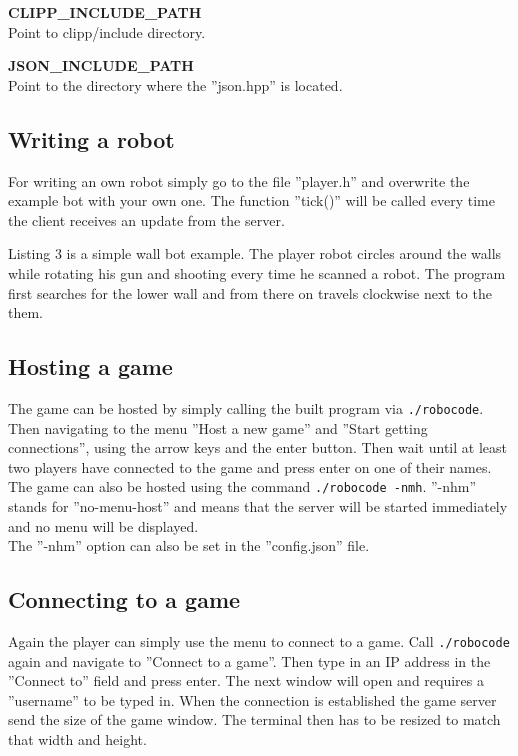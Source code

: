 \documentclass[12pt]{report}
\begin{document}
\textbf{CLIPP\_INCLUDE\_PATH} \\
Point to clipp/include directory.

\textbf{JSON\_INCLUDE\_PATH} \\
Point to the directory where the ''json.hpp'' is located.

\subsection{Writing a robot}
For writing an own robot simply go to the file ''player.h'' and overwrite the example bot with your own one. The function ''tick()'' will be called every time the client receives an update from the server.

\scriptsize

\normalsize

Listing 3 is a simple wall bot example. The player robot circles around the walls while rotating his gun and shooting every time he scanned a robot. The program first searches for the lower wall and from there on travels clockwise next to the them.

\subsection{Hosting a game}
The game can be hosted by simply calling the built program via \lstinline{./robocode}. Then navigating to the menu ''Host a new game'' and ''Start getting connections'', using the arrow keys and the enter button. Then wait until at least two players have connected to the game and press enter on one of their names. \\

The game can also be hosted using the command \lstinline{./robocode -nmh}. ''-nhm'' stands for ''no-menu-host'' and means that the server will be started immediately and no menu will be displayed. \\

The ''-nhm'' option can also be set in the ''config.json'' file.

\subsection{Connecting to a game}
Again the player can simply use the menu to connect to a game. Call \lstinline{./robocode} again and navigate to ''Connect to a game''. Then type in an IP address in the ''Connect to'' field and press enter. The next window will open and requires a ''username'' to be typed in. When the connection is established the game server send the size of the game window. The terminal then has to be resized to match that width and height. \\
\end{document}
